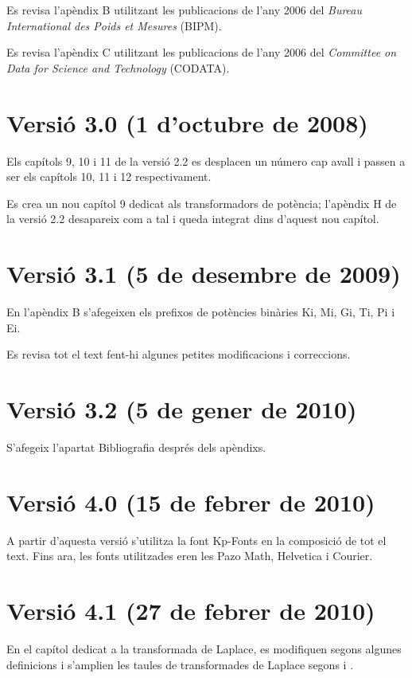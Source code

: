 Es revisa l'apèndix B utilitzant les publicacions de l'any 2006 del \textit{Bureau
International des Poids et Mesures} (BIPM).

Es revisa l'apèndix C utilitzant les publicacions de l'any 2006 del \textit{Committee on Data for Science and Technology} (CODATA).

\section*{Versió 3.0 (1 d'octubre de 2008)}

Els capítols 9, 10 i 11 de la versió 2.2 es desplacen un número cap
avall i passen a ser els capítols 10, 11 i 12 respectivament.

Es crea un nou capítol 9 dedicat als transformadors de potència;
l'apèndix H de la versió 2.2 desapareix com a tal i queda integrat
dins d'aquest nou capítol.


\section*{Versió 3.1 (5 de desembre de 2009)}
En l'apèndix B s'afegeixen els prefixos de potències binàries Ki, Mi, Gi, Ti, Pi i Ei.

Es revisa tot el text fent-hi algunes petites modificacions i
correccions.

\section*{Versió 3.2 (5 de gener de 2010)}
S'afegeix l'apartat Bibliografia després dels apèndixs.


\section*{Versió 4.0 (15 de febrer de 2010)}
A partir d'aquesta versió s'utilitza la font \textsf{Kp-Fonts} en la composició de tot el text. Fins ara, les fonts utilitzades eren les \textsf{Pazo Math}, \textsf{Helvetica} i \textsf{Courier}.


\section*{Versió 4.1 (27 de febrer de 2010)}
En el capítol dedicat a la transformada de Laplace, es modifiquen segons \cite{SCH} algunes definicions  i s'amplien les taules de transformades de Laplace segons \cite{SCH} i \cite{RASd}.

